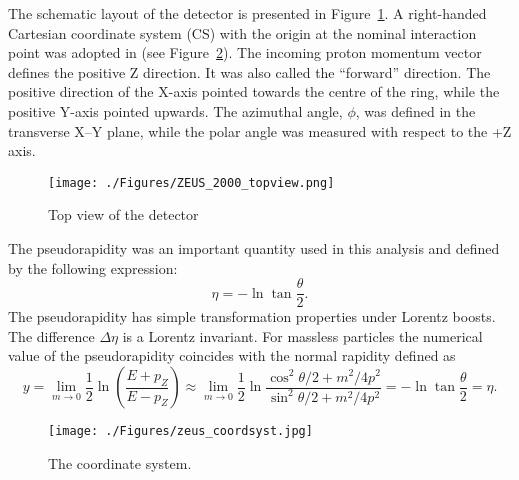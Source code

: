 The schematic layout of the \zeus detector is presented in Figure~\ref{fig:zeus2d1}. A right-handed Cartesian coordinate system (CS) with the origin at the nominal interaction point was adopted in \zeus (see Figure~\ref{fig:zeus_coordsyst}). The incoming proton momentum vector defines the positive Z direction. It was also called the ``forward'' direction. The positive direction of the X-axis pointed towards the centre of the \hera ring, while the positive Y-axis pointed upwards. The azimuthal angle, $\phi$, was defined in the transverse X--Y plane, while the polar angle was measured with respect to the +Z axis. 
\begin{landscape}
\begin{figure}[htpb]
	\centering
		\texttt{[image: ./Figures/ZEUS\_2000\_topview.png]}
	\caption{Top view of the \zeus detector}
	\label{fig:zeus2d1}
\end{figure}
\end{landscape}

The pseudorapidity was an important quantity used in this analysis and defined by the following expression:
\begin{equation}
\eta = -\ln \tan \dfrac{\theta}{2}.
\end{equation}
The pseudorapidity has simple transformation properties under Lorentz boosts. The difference $\Delta \eta$ is a Lorentz invariant. For massless particles the numerical value of the pseudorapidity coincides with the normal rapidity defined as 
\begin{equation}
y=\lim_{m\rightarrow 0}\frac{1}{2}\ln{\left(\frac{E+p_Z}{E-p_Z}\right)}\approx \lim_{m\rightarrow 0}\frac{1}{2}\ln{\frac{\cos^2{\theta/2}+m^2/4p^2}{\sin^2{\theta/2}+m^2/4p^2}} = -\ln \tan \dfrac{\theta}{2} = \eta.
\end{equation}
	
\begin{figure}[htpb]
	\centering
		\texttt{[image: ./Figures/zeus\_coordsyst.jpg]}
	\caption{The \zeus coordinate system.}
	\label{fig:zeus_coordsyst}
\end{figure}
